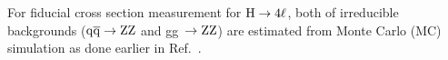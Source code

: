 %	
\par
For fiducial cross section measurement for $\mathrm{H}\rightarrow4\ell$, both of irreducible backgrounds ($\mathrm{q}\mathrm{\overline{q}} \rightarrow \mathrm{Z}\mathrm{Z}$ and gg~$\rightarrow \mathrm{Z}\mathrm{Z}$) are estimated from  Monte Carlo (MC) 
simulation as done earlier in Ref.~\cite{Chatrchyan:2013mxa}. 
